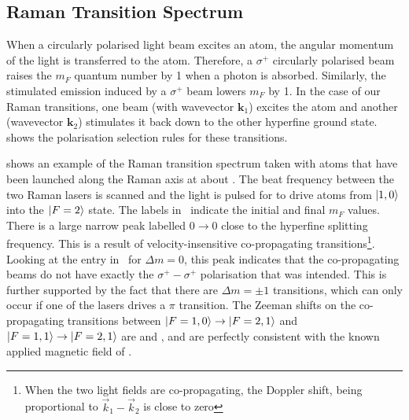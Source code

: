 \subsection{Raman Transition Spectrum}\label{subsec:raman_spec}
When a circularly polarised light beam excites an atom, the angular
momentum of the light is transferred to the atom. Therefore, a
$\sigma^+$ circularly polarised beam raises the $m_F$ quantum number
by 1 when a photon is absorbed. Similarly, the stimulated emission
induced by a $\sigma^+$ beam lowers $m_F$ by 1. In the case of our
Raman transitions, one beam (with wavevector $\textbf{k}_1$) excites
the atom and another (wavevector $\textbf{k}_2$) stimulates it back
down to the other hyperfine ground state.
 shows the polarisation selection
rules for these transitions.
\par\noindent
{} shows an example of the Raman
transition spectrum taken with atoms that have been launched along the
Raman axis at about . The beat frequency
between the two Raman lasers is scanned and the light is pulsed for
 to drive atoms from $\ket{1,0}$ into the \(\ket{F=2}\)
state. The labels in~ indicate the
initial and final $m_F$ values. There is a large narrow peak labelled
$0\rightarrow0$ close to the hyperfine splitting
frequency. This is a result of velocity-insensitive co-propagating
transitions\footnote{When the two light fields are co-propagating, the
  Doppler shift, being proportional to \(\vec{k}_1 -
  \vec{k}_2\) is close to zero}. Looking at the entry
  in~ for $\Delta m = 0$, this peak
  indicates that the co-propagating beams do not have exactly the
  $\sigma^+ - \sigma^+$ polarisation that was intended. This is further supported by the fact
that there are \(\Delta m = \pm 1\) transitions, which can only occur
if one of the lasers drives a \(\pi\) transition. The Zeeman shifts on
the co-propagating transitions between \(\ket{F=1,0}
\rightarrow \ket{F=2,1}\) and \(\ket{F=1,1}\rightarrow \ket{F=2,1}\)
are  and , and
are perfectly consistent with the known applied magnetic field of .
